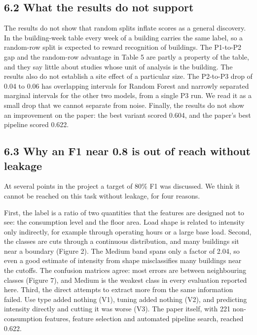 \documentclass[
  10pt,
]{article}
\begin{document}
\hypertarget{what-the-results-do-not-support}{%
\subsection{6.2 What the results do not
support}\label{what-the-results-do-not-support}}

The results do not show that random splits inflate scores as a general
discovery. In the building-week table every week of a building carries
the same label, so a random-row split is expected to reward recognition
of buildings. The P1-to-P2 gap and the random-row advantage in Table 5
are partly a property of the table, and they say little about studies
whose unit of analysis is the building. The results also do not
establish a site effect of a particular size. The P2-to-P3 drop of 0.04
to 0.06 has overlapping intervals for Random Forest and narrowly
separated marginal intervals for the other two models, from a single P3
run. We read it as a small drop that we cannot separate from noise.
Finally, the results do not show an improvement on the paper: the best
variant scored 0.604, and the paper's best pipeline scored 0.622.

\hypertarget{why-an-f1-near-0.8-is-out-of-reach-without-leakage}{%
\subsection{6.3 Why an F1 near 0.8 is out of reach without
leakage}\label{why-an-f1-near-0.8-is-out-of-reach-without-leakage}}

At several points in the project a target of 80\% F1 was discussed. We
think it cannot be reached on this task without leakage, for four
reasons.

First, the label is a ratio of two quantities that the features are
designed not to see: the consumption level and the floor area. Load
shape is related to intensity only indirectly, for example through
operating hours or a large base load. Second, the classes are cuts
through a continuous distribution, and many buildings sit near a
boundary (Figure 2). The Medium band spans only a factor of 2.04, so
even a good estimate of intensity from shape misclassifies many
buildings near the cutoffs. The confusion matrices agree: most errors
are between neighbouring classes (Figure 7), and Medium is the weakest
class in every evaluation reported here. Third, the direct attempts to
extract more from the same information failed. Use type added nothing
(V1), tuning added nothing (V2), and predicting intensity directly and
cutting it was worse (V3). The paper itself, with 221 non-consumption
features, feature selection and automated pipeline search, reached
0.622.
\end{document}

